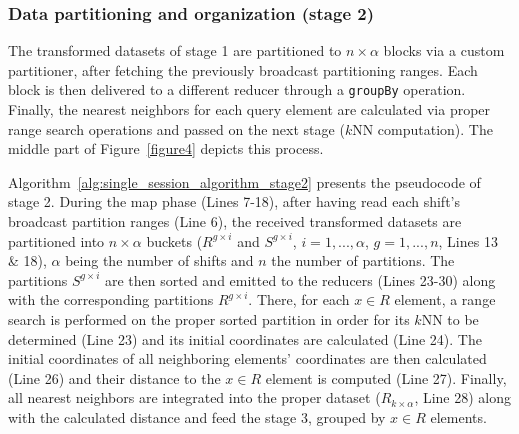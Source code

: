 \subsubsection{Data partitioning and organization (stage 2)}
\label{par:algorithmic2}
The transformed datasets of stage 1 are partitioned to $n \times \alpha$ blocks via a custom partitioner, after fetching the previously broadcast partitioning ranges. Each block is then delivered to a different reducer through a \texttt{groupBy} operation. Finally, the nearest neighbors for each query element are calculated via proper range search operations and passed on the next stage ($k$NN computation). The middle part of Figure~\ref{figure4} depicts this process.

Algorithm~\ref{alg:single_session_algorithm_stage2} presents the pseudocode of stage 2. During the map phase (Lines 7-18), after having read each shift's broadcast partition ranges (Line 6), the received transformed datasets are partitioned into $n \times \alpha$ buckets ($R^{g \times i}$ and $S^{g \times i}$, $i=1,...,\alpha$, $g=1,...,n$, Lines 13 \& 18), $\alpha$ being the number of shifts and $n$ the number of partitions. The partitions $S^{g \times i}$ are then sorted and emitted to the reducers (Lines 23-30) along with the corresponding partitions $R^{g \times i}$. There, for each $x \in R$ element, a range search is performed on the proper sorted partition in order for its $k$NN to be determined (Line 23) and its initial coordinates are calculated (Line 24). The initial coordinates of all neighboring elements' coordinates are then calculated (Line 26) and their distance to the $x \in R$ element is computed (Line 27). Finally, all nearest neighbors are integrated into the proper dataset ($R_{k \times \alpha}$, Line 28) along with the calculated distance and feed the stage 3, grouped by $x \in R$ elements.

